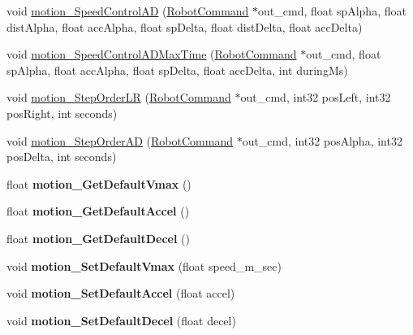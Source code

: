 \begin{DoxyCompactItemize}
\item 
void \hyperlink{classAsservInsa_adeb7a8d4a160f8be0cfecbf721ca2c44}{motion\+\_\+\+Speed\+Control\+AD} (\hyperlink{structRobotCommand}{Robot\+Command} $\ast$out\+\_\+cmd, float sp\+Alpha, float dist\+Alpha, float acc\+Alpha, float sp\+Delta, float dist\+Delta, float acc\+Delta)
\item 
void \hyperlink{classAsservInsa_a949a94fc133abfb6ff87671372a510a8}{motion\+\_\+\+Speed\+Control\+A\+D\+Max\+Time} (\hyperlink{structRobotCommand}{Robot\+Command} $\ast$out\+\_\+cmd, float sp\+Alpha, float acc\+Alpha, float sp\+Delta, float acc\+Delta, int during\+Ms)
\item 
void \hyperlink{classAsservInsa_a8237e3dcb0d9c8852f692c466da10f32}{motion\+\_\+\+Step\+Order\+LR} (\hyperlink{structRobotCommand}{Robot\+Command} $\ast$out\+\_\+cmd, int32 pos\+Left, int32 pos\+Right, int seconds)
\item 
void \hyperlink{classAsservInsa_ab9a32335b1fe9484243f5849680fe510}{motion\+\_\+\+Step\+Order\+AD} (\hyperlink{structRobotCommand}{Robot\+Command} $\ast$out\+\_\+cmd, int32 pos\+Alpha, int32 pos\+Delta, int seconds)
\item 
\mbox{\label{classAsservInsa_a3893eb1ab4224de2931c5aed04461dc7}} 
float {\bfseries motion\+\_\+\+Get\+Default\+Vmax} ()
\item 
\mbox{\label{classAsservInsa_a31dce934fba8861409b304244d6775d8}} 
float {\bfseries motion\+\_\+\+Get\+Default\+Accel} ()
\item 
\mbox{\label{classAsservInsa_a94274dbc29c6d140396c43436d091db6}} 
float {\bfseries motion\+\_\+\+Get\+Default\+Decel} ()
\item 
\mbox{\label{classAsservInsa_a96cf5d8d69183980eedd48d26a2a057d}} 
void {\bfseries motion\+\_\+\+Set\+Default\+Vmax} (float speed\+\_\+m\+\_\+sec)
\item 
\mbox{\label{classAsservInsa_af42a782d8283d3c137108dd511591481}} 
void {\bfseries motion\+\_\+\+Set\+Default\+Accel} (float accel)
\item 
\mbox{\label{classAsservInsa_af61d348814e3696b2463586db43848ea}} 
void {\bfseries motion\+\_\+\+Set\+Default\+Decel} (float decel)
\end{DoxyCompactItemize}
